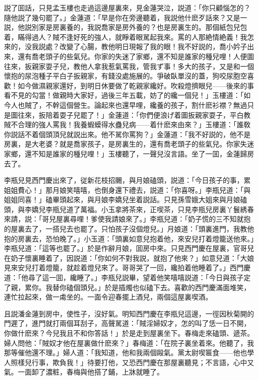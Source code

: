 説了囬話，只見孟玉樓也走過這邊屋裏來，見金蓮哭泣，説道：「你只顧惱怎的？隨他説了幾句罷了。」金蓮道：「早是你在旁邊聽着，我説他什麽歹話來？又是一説，他説別家是房裏養的，我説喬家是房外養的？也是房裏生的。那個紙包兒包着，瞞得過人？賊不逢好死的強人，就睜着眼駡起我來。罵的人那絶情絶義！我怎來的，没我説處？改變了心腸，教他明日現報了我的眼！我不好説的，喬小妗子出來，還有喬老頭子的些氣兒。你家的失迷了家鄉，還不知是誰家的種兒哩！人便圖往來，扳親家耍子兒，教他人拿我惹氣罵我，管我ず事！多大的孩子，又是和一個懷抱的尿泡種子平白子扳親家，有錢没處施展的。爭破臥單沒的蓋，狗咬尿胞空喜歡！如今做濕親家還好，到明日休要做了乾親家纔好。吹殺燈擠眼兒——後來的事看不見的勾當！做親時大家好，過後三年五載，妨了的纔一個兒！」玉樓道：「如今人也賊了，不幹這個營生。論起來也還早哩，纔養的孩子，割什麽衫襟？無過只是圖往來，扳陪着耍子兒罷了！」金蓮道：「你們便浪げ着圖扳親家耍子，平白教賊不合理的強人罵我！我養蝦蟆得水蠱兒病——着什麽來由來？」玉樓道：「誰敎你説話不着個頭頂兒就説出來。他不駡你罵狗？」金蓮道：「我不好説的，他不是房裏，是大老婆？就是喬家孩子，是房裏生的，還有喬老頭子的些氣兒。你家失迷家鄉，還不知是誰家的種兒哩！」玉樓聽了，一聲兒沒言語。坐了一囬，金蓮歸房去了。

李瓶兒見西門慶出來了，従新花枝招颺，與月娘磕頭，説道：「今日孩子的事，累姐姐費心！」那月娘笑嘻嘻，也倒身還下禮去，説道：「你喜呀。」李瓶兒道：「與姐姐同喜！」磕畢頭起來，與月娘李嬌兒坐着説話。只見孫雪娥大姐來與月娘磕頭，與李嬌兒李瓶兒道了萬福。小玉拿將茶來，正喫茶，只見李瓶兒房裏丫鬟綉春來請，説：「哥兒屋裏尋哩！爹使我請娘來了。」李瓶兒道：「奶子慌的三不知就抱的屋裏去了，一搭兒去也罷了。只怕孩子沒個燈兒。」月娘道：「頭裏進門，我教他抱的房裏去，恐怕晚了。」小玉道：「頭裏如意兒抱着他，來安兒打着燈籠送他來。」李瓶兒道：「這等也罷了。」於是作辭月娘，囬房中來。只見西門慶在屋裏，官哥兒在奶子懷裏睡着了，因説道：「你如何不對我説，就抱了他來？」如意兒道：「大娘見來安兒打着燈籠，就趁着燈兒來了。哥哥哭了一回，纔拍着他睡着了。」西門慶道：「他尋了這一囬，纔睡了。」李瓶兒説畢，望着他笑嘻嘻説道：「今日與孩子定了親，累你。我替你磕個頭兒。」於是插燭也似磕下去。喜歡的西門慶滿面堆笑，連忙拉起來，做一䖏坐的。一面令迎春擺上酒兒，兩個這屋裏喫酒。

且説潘金蓮到房中，使性子，沒好氣。明知西門慶在李瓶兒這邊，一徑因秋菊開的門遲了，進門就打兩個耳刮子，高聲駡道：「賊淫婦奴才，怎的叫了恁一日不開，你做什麽來？今兒我且不和你答話！」於是走到屋裏坐下。春梅走來磕頭、遞茶。婦人問他：「賊奴才他在屋裏做什麽來？」春梅道：「在院子裏坐着來。他聽了，我那等催他還不理。」婦人道：「我知道，他和我兩個毆氣。黨太尉喫匾食——他也學人照樣兒行事，欺負我！」待要打他，又恐西門慶在那屋裏聽見；不言語，心中又氣。一面卸了濃粧，春梅與他搭了鋪，上牀就睡了。

